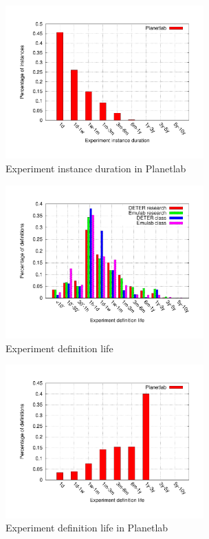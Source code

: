 \begin{figure}[htbp] \begin{center} \includegraphics[width=3in,
type=pdf,ext=.pdf,read=.pdf]{figs/planet.dur.gnu} \caption{Experiment
instance duration in Planetlab} \label{expdur} \end{center} \end{figure}

\begin{figure}[htbp] \begin{center} \includegraphics[width=3in,
type=pdf,ext=.pdf,read=.pdf]{figs/exp.life.gnu} \caption{Experiment
definition life} \label{explife} \end{center} \end{figure}

\begin{figure}[htbp] \begin{center} \includegraphics[width=3in,
type=pdf,ext=.pdf,read=.pdf]{figs/planet.life.gnu} \caption{Experiment
definition life in Planetlab} \label{explife} \end{center} \end{figure}

